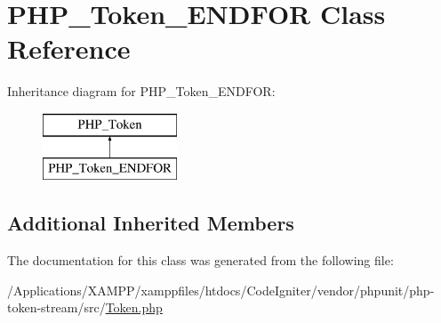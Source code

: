 \hypertarget{class_p_h_p___token___e_n_d_f_o_r}{}\section{P\+H\+P\+\_\+\+Token\+\_\+\+E\+N\+D\+F\+OR Class Reference}
\label{class_p_h_p___token___e_n_d_f_o_r}
Inheritance diagram for P\+H\+P\+\_\+\+Token\+\_\+\+E\+N\+D\+F\+OR\+:\begin{figure}[H]
\begin{center}
\leavevmode
\includegraphics[height=2.000000cm]{class_p_h_p___token___e_n_d_f_o_r}
\end{center}
\end{figure}
\subsection*{Additional Inherited Members}


The documentation for this class was generated from the following file\+:\begin{DoxyCompactItemize}
\item 
/\+Applications/\+X\+A\+M\+P\+P/xamppfiles/htdocs/\+Code\+Igniter/vendor/phpunit/php-\/token-\/stream/src/\mbox{\hyperlink{_token_8php}{Token.\+php}}\end{DoxyCompactItemize}
